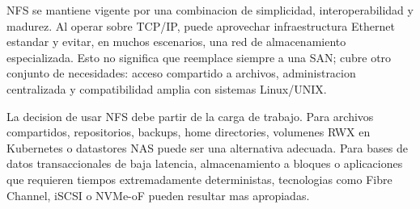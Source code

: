 NFS se mantiene vigente por una combinacion de simplicidad, interoperabilidad y madurez. Al operar sobre TCP/IP, puede aprovechar infraestructura Ethernet estandar y evitar, en muchos escenarios, una red de almacenamiento especializada. Esto no significa que reemplace siempre a una SAN; cubre otro conjunto de necesidades: acceso compartido a archivos, administracion centralizada y compatibilidad amplia con sistemas Linux/UNIX.

La decision de usar NFS debe partir de la carga de trabajo. Para archivos compartidos, repositorios, backups, home directories, volumenes RWX en Kubernetes o datastores NAS puede ser una alternativa adecuada. Para bases de datos transaccionales de baja latencia, almacenamiento a bloques o aplicaciones que requieren tiempos extremadamente deterministas, tecnologias como Fibre Channel, iSCSI o NVMe-oF pueden resultar mas apropiadas.
